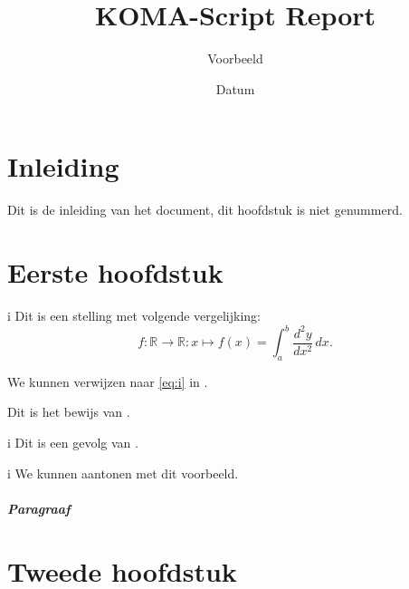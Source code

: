 \documentclass[
    fontsize=10pt,
    twoside=semi,
    usegeometry,
    autoenlargeheadfoot=false,
    toc=bibliography,
]{scrreprt}
\title{KOMA-Script Report}
\subtitle{Voorbeeld}
\date{Datum}
\begin{document}
    \maketitle
    \tableofcontents
    \chapter*{Inleiding}
    Dit is de inleiding van het document, dit hoofdstuk is niet genummerd.

    \chapter{Eerste hoofdstuk}
    \lipsum[1]
    \begin{stelling}{}{i}
        Dit is een stelling met volgende vergelijking:
        \begin{equation}\label{eq:i}
            f\colon \mathbb{R} \to \mathbb{R}\colon x \mapsto f(x) = \int_{a}^{b} \frac{d^2y}{dx^2}\,dx.
        \end{equation}
  \end{stelling}
  We kunnen verwijzen naar \cref{eq:i} in .
  \begin{bewijs}{}{}
      Dit is het bewijs van .
  \end{bewijs}
  \begin{gevolg}{}{i}
      Dit is een gevolg van .
  \end{gevolg}
  \begin{voorbeeld}{}{i}
      We kunnen  aantonen met dit voorbeeld.
  \end{voorbeeld}

  \paragraph{Paragraaf}
  \lipsum[2]
  \lipsum[3]

    \chapter{Tweede hoofdstuk}
    \lipsum
\end{document}
